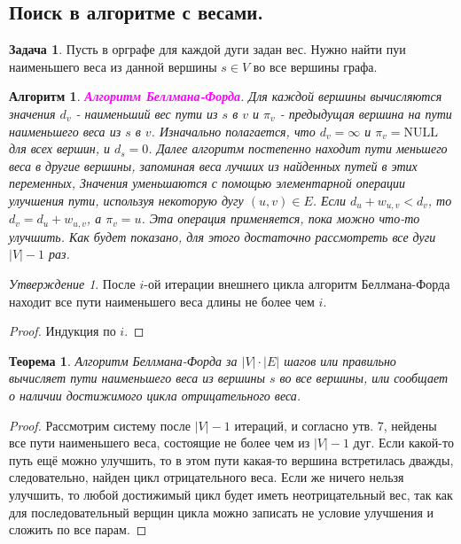 \documentclass[a4paper]{article}
\theoremstyle{indented}
\newtheorem{theorem}{Теорема}
\newtheorem{alg}{Алгоритм}
\theoremstyle{definition}
\newtheorem{prob}{Задача}
\theoremstyle{remark}
\newtheorem{stat}{Утверждение}
\begin{document}
\subsection{Поиск в алгоритме с весами.}

\begin{prob}
    Пусть в орграфе для каждой дуги задан вес. Нужно найти пуи наименьшего веса из данной вершины $s\in V$ во все вершины графа.
\end{prob}

\begin{alg}
    \textcolor{magenta}{\hypertarget{t14}{\textbf{Алгоритм Беллмана-Форда}}}. Для каждой вершины вычисляются значения $d_v$ - наименьший вес пути из $s$ в $v$ и $\pi_v$ - предыдущая вершина на пути наименьшего веса из $s$ в $v$. Изначально полагается, что $d_v=\infty$ и $\pi_v=\text{NULL}$ для всех вершин, и $d_s=0$. Далее алгоритм постепенно находит пути меньшего веса в другие вершины, запоминая веса лучших из найденных путей в этих переменных, Значения уменьшаются с помощью элементарной операции улучшения пути, используя некоторую дугу $(u, v)\in E$. Если $d_u+w_{u, v}<d_v$, то $d_v=d_u+w_{u, v}$, а $\pi_v=u$. Эта операция применяется, пока можно что-то улучшить. Как будет показано, для этого достаточно рассмотреть все дуги $|V|-1$ раз.
\end{alg}

\begin{stat}
    После $i$-ой итерации внешнего цикла алгоритм Беллмана-Форда находит все пути наименьшего веса длины не более чем $i$. 
\end{stat}

\begin{proof}
    Индукция по $i$. 
\end{proof}

\begin{theorem}
    Алгоритм Беллмана-Форда за $|V|\cdot|E|$ шагов или правильно вычисляет пути наименьшего веса из вершины $s$ во все вершины, или сообщает о наличии достижимого цикла отрицательного веса. 
\end{theorem}

\begin{proof}
    Рассмотрим систему после $|V|-1$ итераций, и согласно утв. 7, нейдены все пути наименьшего веса, состоящие не более чем из $|V|-1$ дуг. Если какой-то путь ещё можно улучшить, то в этом пути какая-то вершина встретилась дважды, следовательно, найден цикл отрицательного веса. Если же ничего нельзя улучшить, то любой достижимый цикл будет иметь неотрицательный вес, так как для последовательный верщин цикла можно записать не условие улучшения и сложить по все парам.
\end{proof}
\end{document}
